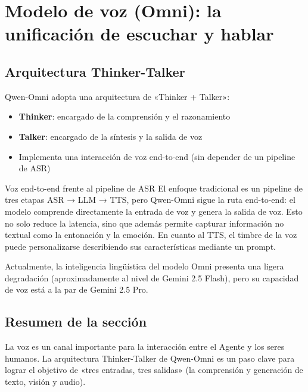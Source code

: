 \section{Modelo de voz (Omni): la unificación de escuchar y hablar}

\subsection{Arquitectura Thinker-Talker}

Qwen-Omni adopta una arquitectura de «Thinker + Talker»:

\begin{itemize}
    \item \textbf{Thinker}: encargado de la comprensión y el razonamiento
    \item \textbf{Talker}: encargado de la síntesis y la salida de voz
    \item Implementa una interacción de voz end-to-end (sin depender de un pipeline de ASR)
\end{itemize}

\begin{knowledgebox}{Voz end-to-end frente al pipeline de ASR}
El enfoque tradicional es un pipeline de tres etapas ASR → LLM → TTS, pero Qwen-Omni sigue la ruta end-to-end: el modelo comprende directamente la entrada de voz y genera la salida de voz. Esto no solo reduce la latencia, sino que además permite capturar información no textual como la entonación y la emoción. En cuanto al TTS, el timbre de la voz puede personalizarse describiendo sus características mediante un prompt.
\end{knowledgebox}

Actualmente, la inteligencia lingüística del modelo Omni presenta una ligera degradación (aproximadamente al nivel de Gemini 2.5 Flash), pero su capacidad de voz está a la par de Gemini 2.5 Pro.

\subsection{Resumen de la sección}

La voz es un canal importante para la interacción entre el Agente y los seres humanos. La arquitectura Thinker-Talker de Qwen-Omni es un paso clave para lograr el objetivo de «tres entradas, tres salidas» (la comprensión y generación de texto, visión y audio).
